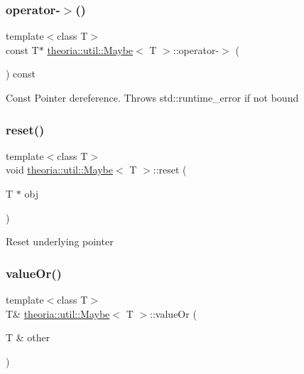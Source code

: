 \subsubsection{\texorpdfstring{operator-\/$>$()}{operator->()}\hspace{0.1cm}{\footnotesize\ttfamily [2/2]}}
{\footnotesize\ttfamily template$<$class T$>$ \\
const T$\ast$ \hyperlink{classtheoria_1_1util_1_1Maybe}{theoria\+::util\+::\+Maybe}$<$ T $>$\+::operator-\/$>$ (\begin{DoxyParamCaption}{ }\end{DoxyParamCaption}) const\hspace{0.3cm}{\ttfamily [inline]}}

Const Pointer dereference. Throws std\+::runtime\+\_\+error if not bound \mbox{\label{classtheoria_1_1util_1_1Maybe_a2e841f2d88d2fefa3d9936a1edadfae4}} 
\subsubsection{\texorpdfstring{reset()}{reset()}}
{\footnotesize\ttfamily template$<$class T$>$ \\
void \hyperlink{classtheoria_1_1util_1_1Maybe}{theoria\+::util\+::\+Maybe}$<$ T $>$\+::reset (\begin{DoxyParamCaption}\item[{T $\ast$}]{obj }\end{DoxyParamCaption})\hspace{0.3cm}{\ttfamily [inline]}}

Reset underlying pointer \mbox{\label{classtheoria_1_1util_1_1Maybe_a0277381962cd4f2dc1d92f75a4cd964c}} 
\subsubsection{\texorpdfstring{value\+Or()}{valueOr()}\hspace{0.1cm}{\footnotesize\ttfamily [1/2]}}
{\footnotesize\ttfamily template$<$class T$>$ \\
T\& \hyperlink{classtheoria_1_1util_1_1Maybe}{theoria\+::util\+::\+Maybe}$<$ T $>$\+::value\+Or (\begin{DoxyParamCaption}\item[{T \&}]{other }\end{DoxyParamCaption})\hspace{0.3cm}{\ttfamily [inline]}}

